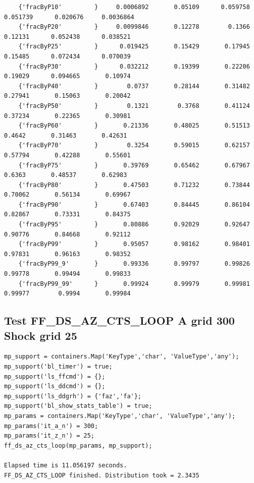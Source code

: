 \documentclass[
]{book}
\begin{document}
\begin{verbatim}
    {'fracByP10'         }     0.0006892       0.05109      0.059758      0.051739      0.020676     0.0036864 
    {'fracByP20'         }     0.0099846       0.12278        0.1366       0.12131      0.052438      0.038521 
    {'fracByP25'         }      0.019425       0.15429       0.17945       0.15485      0.072434      0.070039 
    {'fracByP30'         }      0.032212       0.19399       0.22206       0.19029      0.094665       0.10974 
    {'fracByP40'         }        0.0737       0.28144       0.31482       0.27941       0.15063       0.20042 
    {'fracByP50'         }        0.1321        0.3768       0.41124       0.37234       0.22365       0.30981 
    {'fracByP60'         }       0.21336       0.48025       0.51513        0.4642       0.31463       0.42631 
    {'fracByP70'         }        0.3254       0.59015       0.62157       0.57794       0.42288       0.55601 
    {'fracByP75'         }       0.39769       0.65462       0.67967        0.6363       0.48537       0.62983 
    {'fracByP80'         }       0.47503       0.71232       0.73844       0.70062       0.56134       0.69967 
    {'fracByP90'         }       0.67403       0.84445       0.86104       0.82867       0.73331       0.84375 
    {'fracByP95'         }       0.80886       0.92029       0.92647       0.90776       0.84668       0.92112 
    {'fracByP99'         }       0.95057       0.98162       0.98401       0.97831       0.96163       0.98352 
    {'fracByP99_9'       }       0.99336       0.99797       0.99826       0.99778       0.99494       0.99833 
    {'fracByP99_99'      }       0.99924       0.99979       0.99981       0.99977        0.9994       0.99984 
\end{verbatim}

\hypertarget{test-ff_ds_az_cts_loop-a-grid-300-shock-grid-25}{%
\subsection{Test FF\_DS\_AZ\_CTS\_LOOP A grid 300 Shock grid 25}\label{test-ff_ds_az_cts_loop-a-grid-300-shock-grid-25}}

\begin{verbatim}
mp_support = containers.Map('KeyType','char', 'ValueType','any');
mp_support('bl_timer') = true;
mp_support('ls_ffcmd') = {};
mp_support('ls_ddcmd') = {};
mp_support('ls_ddgrh') = {'faz','fa'};
mp_support('bl_show_stats_table') = true;
mp_params = containers.Map('KeyType','char', 'ValueType','any');
mp_params('it_a_n') = 300;
mp_params('it_z_n') = 25;
ff_ds_az_cts_loop(mp_params, mp_support);

Elapsed time is 11.056197 seconds.
FF_DS_AZ_CTS_LOOP finished. Distribution took = 2.3435
\end{verbatim}
\end{document}
